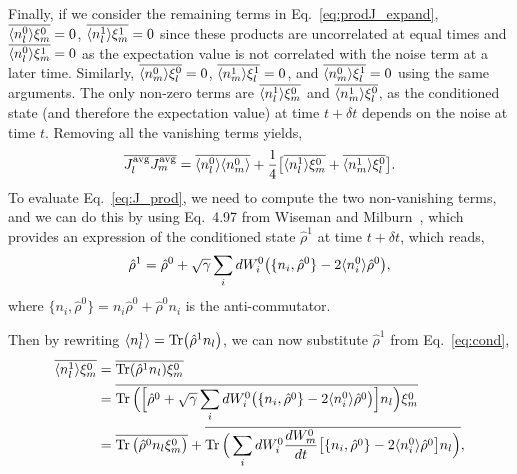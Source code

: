 Finally, if we consider the remaining terms in Eq.~\ref{eq:prodJ_expand}, $\overline{\langle n_l^0\rangle \xi_m^0} = 0$, $\overline{\langle n_l^1\rangle \xi_m^1} = 0$ since these products are uncorrelated at equal times and $\overline{ \langle n_l^0\rangle \xi_m^1 } = 0$ as the expectation value is not correlated with the noise term at a later time. Similarly, $\overline{\langle n_m^0\rangle \xi_l^0} = 0$, $\overline{\langle n_m^1\rangle \xi_l^1} = 0$, and $\overline{ \langle n_m^0\rangle \xi_l^1 } = 0$ using the same arguments. The only non-zero terms are $\overline{ \langle n_l^1\rangle \xi_m^0}$ and $\overline{ \langle n_m^1\rangle \xi_l^0}$, as the conditioned state (and therefore the expectation value) at time $t+\delta t$ depends on the noise at time $t$. 
Removing all the vanishing terms yields, 
\begin{equation}
\label{eq:J_prod}
    \overline{J_l^\text{avg} J_m^\text{avg}} = \overline{\langle n_l^0\rangle \langle n_m^0\rangle } + \frac{1}{4} \big[\overline{\langle n_l^1\rangle \xi_m^0} + \overline{ \langle n_m^1\rangle \xi_l^0 } \big].
\end{equation}
To evaluate Eq.~\ref{eq:J_prod}, we need to compute the two non-vanishing terms, and we can do this by using Eq.~4.97 from Wiseman and Milburn~\cite{wiseman2009}, which provides an expression of the conditioned state $\hat{\rho}^1$ at time $t+\delta t$, which reads, 
\begin{equation}
\label{eq:cond}
    \hat{\rho}^1 = \hat{\rho}^0 + \sqrt{\gamma} \sum\limits_i dW_i^0 \big( \{n_i, \hat{\rho}^0\} - 2 \langle n_i^0\rangle \hat{\rho}^0 \big),
\end{equation}
where $\{n_i, \hat{\rho}^0\} = n_i \hat{\rho}^0 + \hat{\rho}^0 n_i$ is the anti-commutator.

Then by rewriting $\langle n_l^1\rangle = \Tr(\hat{\rho}^1 n_l)$, we can now substitute $\hat{\rho}^1$ from Eq.~\ref{eq:cond},
\begin{align}
\begin{split}
    \overline{\langle n_l^1\rangle \xi_m^0} &= \overline{ \Tr(\hat{\rho}^1 n_l) \xi_m^0} \\ 
    &= \overline{ \Tr\Big( \Big[ \hat{\rho}^0 + \sqrt{\gamma} \sum\limits_i dW_i^0 \big( \{n_i, \hat{\rho}^0\} - 2 \langle n_i^0\rangle \hat{\rho}^0 \big) \Big]  n_l \Big) \xi_m^0} \\
    &= \overline{\Tr\big( \hat{\rho}^0 n_l \xi_m^0 \big)} + \overline{\Tr\Big( \sum\limits_i dW_i^0 \frac{dW_m^0 }{dt} \big[ \{n_i, \hat{\rho}^0\} - 2 \langle n_i^0\rangle\hat{\rho}^0 \big]   n_l \Big)},    
\end{split}
\end{align}

